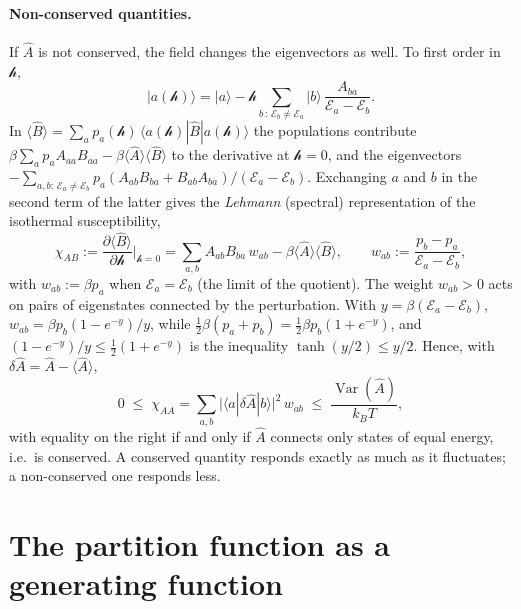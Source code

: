\documentclass[10pt,a4paper]{article}
\theoremstyle{plain}
\newcommand{\Var}{\operatorname{Var}}
\newcommand{\hfield}{\mathscr{h}}  %
\newcommand{\enrg}{\mathcal{E}}  %
\begin{document}
\paragraph{Non-conserved quantities.} If $ \hat A $ is not conserved, the
field changes the eigenvectors as well. To first order in $ \hfield $,
\[
  |a(\hfield)\rangle = |a\rangle - \hfield\sum_{b\,:\,\enrg_b\neq\enrg_a}|b\rangle\,\frac{A_{ba}}{\enrg_a - \enrg_b} .
\]
In $ \langle\hat B\rangle = \sum_ap_a(\hfield)\,\langle a(\hfield)|\hat B|a(\hfield)\rangle $
the populations contribute
$ \beta\sum_ap_aA_{aa}B_{aa} - \beta\langle\hat A\rangle\langle\hat B\rangle $
to the derivative at $ \hfield = 0 $, and the eigenvectors
$ -\sum_{a,b:\,\enrg_a\neq\enrg_b}p_a(A_{ab}B_{ba} + B_{ab}A_{ba})/(\enrg_a - \enrg_b) $.
Exchanging $ a $ and $ b $ in the second term of the latter gives the
\emph{Lehmann} (spectral) representation of the isothermal susceptibility,
\begin{equation}\label{eq:filt_mb_kubo}
  \chi_{AB} := \frac{\partial\langle\hat B\rangle}{\partial \hfield}\bigg|_{\hfield=0}
  = \sum_{a,b}A_{ab}B_{ba}\,w_{ab} - \beta\langle\hat A\rangle\langle\hat B\rangle ,
  \qquad
  w_{ab} := \frac{p_b - p_a}{\enrg_a - \enrg_b} ,
\end{equation}
with $ w_{ab} := \beta p_a $ when $ \enrg_a = \enrg_b $ (the limit of the
quotient). The weight $ w_{ab} > 0 $ acts on pairs of eigenstates connected
by the perturbation. With $ y = \beta(\enrg_a - \enrg_b) $,
$ w_{ab} = \beta p_b(1 - e^{-y})/y $, while
$ \tfrac12\beta(p_a + p_b) = \tfrac12\beta p_b(1 + e^{-y}) $, and
$ (1 - e^{-y})/y \leq \tfrac12(1 + e^{-y}) $ is the inequality
$ \tanh(y/2) \leq y/2 $. Hence, with
$ \delta\hat A = \hat A - \langle\hat A\rangle $,
\begin{equation}\label{eq:filt_chibound}
  0 \;\leq\; \chi_{AA} = \sum_{a,b}\big|\langle a|\delta\hat A|b\rangle\big|^{2}\,w_{ab}
  \;\leq\; \frac{\Var(\hat A)}{k_BT} ,
\end{equation}
with equality on the right if and only if $ \hat A $ connects only states
of equal energy, i.e.\ is conserved. A conserved quantity responds exactly
as much as it fluctuates; a non-conserved one responds less.

\section{The partition function as a generating function}
\label{app:generating}
\end{document}
